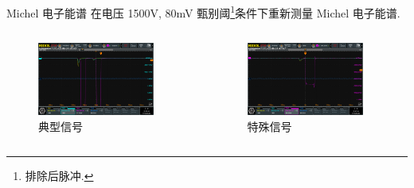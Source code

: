 \documentclass[10pt]{beamer}
\begin{document}
\begin{frame}[label={sec:org22ce4b5}]{Michel 电子能谱}
在电压 1500V, 80mV 甄别阈\footnote{排除后脉冲.}条件下重新测量 Michel 电子能谱.
\begin{columns}
\begin{column}{0.5\columnwidth}
\begin{figure}[htbp]
\centering
\includegraphics[width=0.9\textwidth]{../../ExperimentData/michel/michel/mudecay0.png}
\caption{典型信号}
\end{figure}
\end{column}

\begin{column}{0.5\columnwidth}
\begin{figure}[htbp]
\centering
\includegraphics[width=0.9\textwidth]{../../ExperimentData/michel/michel/mudecay3.png}
\caption{特殊信号}
\end{figure}
\end{column}
\end{columns}
\end{frame}
\end{document}

